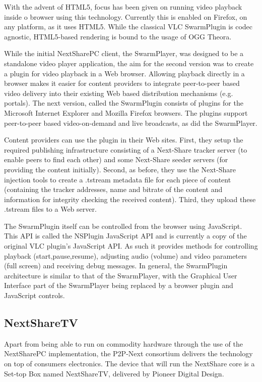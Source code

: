 With the advent of HTML5, focus has been given on running video playback
inside o browser using this technology. Currently this is enabled on Firefox,
on any platform, as it uses HTML5. While the classical VLC SwarmPlugin is
codec agnostic, HTML5-based rendering is bound to the usage of OGG Theora.

While the initial NextSharePC client, the SwarmPlayer, was designed to be a
standalone video player application, the aim for the second version was to
create a plugin for video playback in a Web browser. Allowing playback
directly in a browser makes it easier for content providers to integrate
peer-to-peer based video delivery into their existing Web based distribution
mechanisms (e.g. portals). The next version, called the SwarmPlugin consists of
plugins for the Microsoft Internet Explorer and Mozilla Firefox browsers. The
plugins support peer-to-peer based video-on-demand and live broadcasts, as
did the SwarmPlayer.

Content providers can use the plugin in their Web sites. First, they setup the
required publishing infrastructure consisting of a Next-Share tracker server
(to enable peers to find each other) and some Next-Share seeder servers (for
providing the content initially). Second, as before, they use the Next-Share
injection tools to create a .tstream metadata file for each piece of content
(containing the tracker addresses, name and bitrate of the content and
information for integrity checking the received content). Third, they upload
these .tstream files to a Web server.

The SwarmPlugin itself can be controlled from the browser using JavaScript.
This API is called the NSPlugin JavaScript API and is currently a copy of the
original VLC plugin's JavaScript API.  As such it provides
methods for controlling playback (start,pause,resume), adjusting audio
(volume) and video parameters (full screen) and receiving debug messages. In
general, the SwarmPlugin architecture is similar to that of the SwarmPlayer,
with the Graphical User Interface part of the SwarmPlayer being replaced by a
browser plugin and JavaScript controls.

\subsection{NextShareTV}
\label{subsec:multimedia-dist:nextshare-tv}

Apart from being able to run on commodity hardware through the use of the
NextSharePC implementation, the P2P-Next consortium delivers the technology
on top of consumers electronics. The device that will run the NextShare core
is a Set-top Box named NextShareTV, delivered by Pioneer Digital Design.

